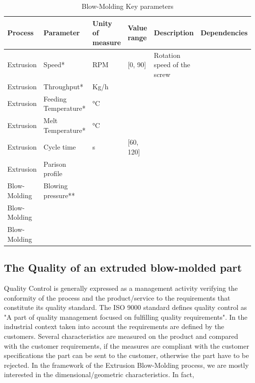 \begin{landscape}
\begin{table}[]
\caption{Blow-Molding Key parameters}
\label{tab:key_parameters}
\begin{tabular}{|l|l|l|l|l|l|}
\hline
Process      & Parameter            & Unity of measure & Value range   & Description                 & Dependencies \\ \hline
Extrusion    & Speed*               & RPM              & {[}0, 90{]}   & Rotation speed of the screw &              \\ \hline
Extrusion    & Throughput*          & Kg/h             &               &                             &              \\ \hline
Extrusion    & Feeding Temperature* & °C               &               &                             &              \\ \hline
Extrusion    & Melt Temperature*    & °C               &               &                             &              \\ \hline
Extrusion    & Cycle time           & s                & {[}60, 120{]} &                             &              \\ \hline
Extrusion    & Parison profile      &                  &               &                             &              \\ \hline
Blow-Molding & Blowing pressure**   &                  &               &                             &              \\ \hline
Blow-Molding &                      &                  &               &                             &              \\ \hline
Blow-Molding &                      &                  &               &                             &              \\ \hline
\end{tabular}
\end{table}
\end{landscape}

\subsection{The Quality of an extruded blow-molded part}

Quality Control is generally expressed as a management activity verifying the conformity of the process and the product/service to the requirements that constitute its quality standard. The ISO 9000 standard defines quality control as "A part of quality management focused on fulfilling quality requirements". In the industrial context taken into account the requirements are defined by the customers. Several characteristics are measured on the product and compared with the customer requirements, if the measures are compliant with the customer specifications the part can be sent to the customer, otherwise the part have to be rejected. 
In the framework of the Extrusion Blow-Molding process, we are mostly interested in the dimensional/geometric characteristics. In fact, 


